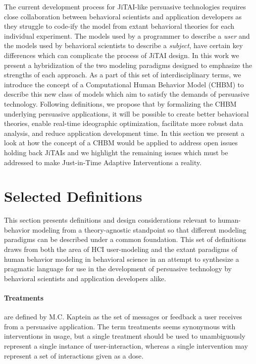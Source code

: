 \documentclass[runningheads,a4paper]{llncs}
\begin{document}
The current development process for JiTAI-like persuasive technologies requires close collaboration between behavioral scientists and application developers as they struggle to code-ify the model from extant behavioral theories for each individual experiment.
The models used by a programmer to describe a \emph{user} and the models used by behavioral scientists to describe a \emph{subject}, have certain key differences which can complicate the process of JiTAI design.
In this work we present a hybridization of the two modeling paradigms designed to emphasize the strengths of each approach.
As a part of this set of interdisciplinary terms, we introduce the concept of a Computational Human Behavior Model (CHBM) to describe this new class of models which aim to satisfy the demands of persuasive technology.
Following definitions, we propose that by formalizing the CHBM underlying persuasive applications, it will be possible to create better behavioral theories, enable real-time ideographic optimization, facilitate more robust data analysis, and reduce application development time. 
In this section we present a look at how the concept of a CHBM would be applied to address open issues holding back JiTAIs and we highlight the remaining issues which must be addressed to make Just-in-Time Adaptive Interventions a reality.

\section{Selected Definitions}

This section presents definitions and design considerations relevant to human-behavior modeling from a theory-agnostic standpoint so that different modeling paradigms can be described under a common foundation.
This set of definitions draws from both the area of HCI user-modeling and the extant paradigms of human behavior modeling in behavioral science in an attempt to synthesize a pragmatic language for use in the development of persuasive technology by behavioral scientists and application developers alike.

\paragraph{Treatments} are defined by M.C. Kaptein \cite{kaptein2015formalizing} as the set of messages or feedback a user receives from a persuasive application. 
The term treatments seems synonymous with interventions in usage, but a single treatment should be used to unambiguously represent a single instance of user-interaction, whereas a single intervention may represent a set of interactions given as a dose.
\end{document}
